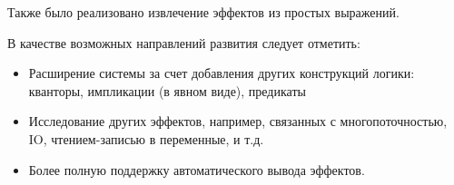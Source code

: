 Также было реализовано извлечение эффектов из простых выражений.

В качестве возможных направлений развития следует отметить:

\begin{itemize}
	\item Расширение системы за счет добавления других конструкций логики: кванторы, импликации (в явном виде), предикаты
	
	\item Исследование других эффектов, например, связанных с многопоточностью, IO, чтением-записью в переменные, и т.д.
	
	\item Более полную поддержку автоматического вывода эффектов.
\end{itemize}